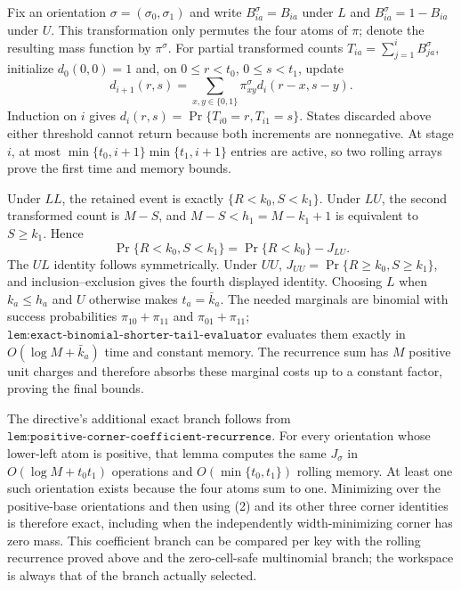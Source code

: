 Fix an orientation \(\sigma=(\sigma_0,\sigma_1)\) and write \(B_{ia}^{\sigma}=B_{ia}\) under \(L\) and \(B_{ia}^{\sigma}=1-B_{ia}\) under \(U\). This transformation only permutes the four atoms of \(\pi\); denote the resulting mass function by \(\pi^\sigma\). For partial transformed counts \(T_{ia}=\sum_{j=1}^iB_{ja}^{\sigma}\), initialize \(d_0(0,0)=1\) and, on \(0\le r<t_0\), \(0\le s<t_1\), update
\[
d_{i+1}(r,s)=\sum_{x,y\in\{0,1\}}\pi^\sigma_{xy}d_i(r-x,s-y).
\tag{1}
\]
Induction on \(i\) gives \(d_i(r,s)=\Pr\{T_{i0}=r,T_{i1}=s\}\). States discarded above either threshold cannot return because both increments are nonnegative. At stage \(i\), at most \(\min\{t_0,i+1\}\min\{t_1,i+1\}\) entries are active, so two rolling arrays prove the first time and memory bounds.

Under \(LL\), the retained event is exactly \(\{R<k_0,S<k_1\}\). Under \(LU\), the second transformed count is \(M-S\), and \(M-S<h_1=M-k_1+1\) is equivalent to \(S\ge k_1\). Hence
\[
\Pr\{R<k_0,S<k_1\}=\Pr\{R<k_0\}-J_{LU}.
\tag{2}
\]
The \(UL\) identity follows symmetrically. Under \(UU\), \(J_{UU}=\Pr\{R\ge k_0,S\ge k_1\}\), and inclusion--exclusion gives the fourth displayed identity. Choosing \(L\) when \(k_a\le h_a\) and \(U\) otherwise makes \(t_a=\bar k_a\). The needed marginals are binomial with success probabilities \(\pi_{10}+\pi_{11}\) and \(\pi_{01}+\pi_{11}\); \(\texttt{lem:exact-binomial-shorter-tail-evaluator}\) evaluates them exactly in \(O(\log M+\bar k_a)\) time and constant memory. The recurrence sum has \(M\) positive unit charges and therefore absorbs these marginal costs up to a constant factor, proving the final bounds.

The directive's additional exact branch follows from \(\texttt{lem:positive-corner-coefficient-recurrence}\). For every orientation whose lower-left atom is positive, that lemma computes the same \(J_\sigma\) in \(O(\log M+t_0t_1)\) operations and \(O(\min\{t_0,t_1\})\) rolling memory. At least one such orientation exists because the four atoms sum to one. Minimizing over the positive-base orientations and then using (2) and its other three corner identities is therefore exact, including when the independently width-minimizing corner has zero mass. This coefficient branch can be compared per key with the rolling recurrence proved above and the zero-cell-safe multinomial branch; the workspace is always that of the branch actually selected.